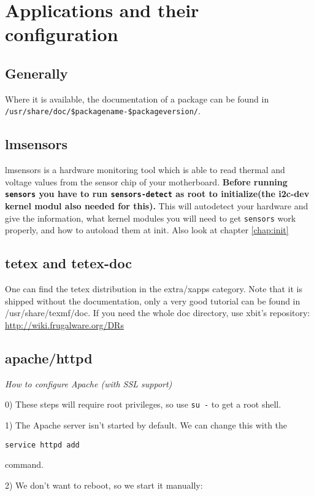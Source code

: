\chapter{Applications and their configuration}

\section{Generally}
Where it is available, the documentation of a package can be found in {\tt /usr/share/doc/\$packagename-\$packageversion/}. 

\section{lmsensors}

lmsensors is a hardware monitoring tool which is able to read thermal and voltage values from the sensor chip of your motherboard.
\textbf{Before running {\tt sensors} you have to run {\tt sensors-detect} as root to initialize(the i2c-dev kernel modul also needed for this).} This will autodetect your hardware and give the information, what kernel modules you will need to get {\tt sensors} work properly, and how to autoload them at init. Also look at chapter \ref{chap:init}

\section{tetex and tetex-doc}

One can find the tetex distribution in the extra/xapps category. Note that it is shipped without the documentation, only a very good tutorial can be found in /usr/share/texmf/doc.
If you need the whole doc directory, use xbit's repository:
\url{http://wiki.frugalware.org/DRs}

\section{apache/httpd}

\textit{How to configure Apache (with SSL support)}

0) These steps will require root privileges, so use {\tt su -} to get a root shell.

1) The Apache server isn't started by default. We can change this with the

{\tt service httpd add}

command.

2) We don't want to reboot, so we start it manually:

